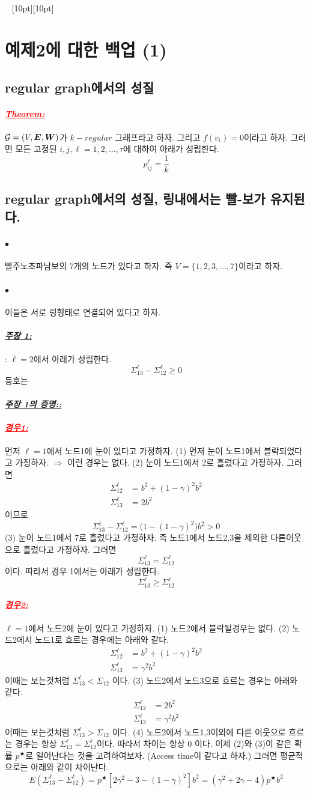 \documentclass[12pt,oneside,english,a4paper]{article}
\newcommand{\dash}{\noindent \newline\textcolor{black}{\hrulefill~ \raisebox{-2.5pt}[10pt][10pt]{\leafright \decofourleft \decothreeleft  \aldineright \decotwo \floweroneleft \decoone   \floweroneright \decotwo \aldineleft\decothreeright \decofourright \leafleft} ~  \hrulefill}}
\def\ck{\paragraph{\LARGE$\bullet$}\LARGE}
\newcommand{\para}[1]{\paragraph{\LARGE\it\underline{\textbf{#1:}}}\LARGE}
\newcommand{\parared}[1]{\paragraph{\LARGE\textcolor{red}{\it\underline{\textbf{#1:}}}}\LARGE}
\newcommand{\bsE}{\mbox{\boldmath $E$}}
\newcommand{\bsW}{\mbox{\boldmath $W$}}
\begin{document}
\dash 

\section{예제2에 대한 백업 (1)}
\subsection{regular graph에서의 성질}
\parared{Theorem} ${\cal G}=(V,\bsE,\bsW)$가 $k-regular$ 그래프라고 하자. 그리고 $f(v_i)=0$이라고 하자. 그러면 모든 고정된 $i, j,\ell=1,2,\dots,\tau$에 대하여 아래가 성립한다.
\[
p_{ij}^{\ell}=\frac{1}{k}
\]

\subsection{regular graph에서의 성질, 링내에서는 빨-보가 유지된다.}
\ck 빨주노초파남보의 7개의 노드가 있다고 하자. 즉 $V=\{1,2,3,\dots,7\}$이라고 하자. 

\ck 이들은 서로 링형태로 연결되어 있다고 하자. 

\para{주장 1}: $\ell=2$에서 아래가 성립한다.
\[
\Sigma_{13}^{\ell}-\Sigma_{12}^{\ell}\geq 0
\]
등호는 

\para{주장 1의 증명:}
\parared{경우1} 먼저 $\ell=1$에서 노드1에 눈이 있다고 가정하자. (1) 먼저 눈이 노드1에서 블락되었다고 가정하자. $\Longrightarrow$ 이런 경우는 없다. (2) 눈이 노드1에서 2로 흘렀다고 가정하자. 그러면 
\begin{align*}
\Sigma_{12}^{\ell}&=b^2+(1-\gamma)^2b^2 \\
\Sigma_{13}^{\ell}&=2b^2
\end{align*}
이므로 
\[
\Sigma_{13}^{\ell}-\Sigma_{12}^{\ell}=\big(1-(1-\gamma)^2\big)b^2>0
\]
(3) 눈이 노드1에서 7로 흘렀다고 가정하자. 즉 노드1에서 노드2,3을 제외한 다른이웃으로 흘렀다고 가정하자. 그러면 
\[
\Sigma_{13}^{\ell}=\Sigma_{12}^{\ell}
\]
이다. 따라서 경우 1에서는 아래가 성립한다. 
\[
\Sigma_{13}^{\ell}\geq\Sigma_{12}^{\ell}
\] 

\parared{경우2} $\ell=1$에서 노드2에 눈이 있다고 가정하자.
(1) 노드2에서 블락될경우는 없다. (2) 노드2에서 노드1로 흐르는 경우에는 아래와 같다. 
\begin{align*}
\Sigma_{12}^{\ell}&=b^2+(1-\gamma)^2b^2 \\
\Sigma_{13}^{\ell}&=\gamma^2b^2
\end{align*}
이때는 보는것처럼 $\Sigma_{13}^{\ell}<\Sigma_{12}$ 이다. (3) 노드2에서 노드3으로 흐르는 경우는 아래와 같다. 
\begin{align*}
\Sigma_{12}^{\ell}&=2b^2 \\
\Sigma_{13}^{\ell}&=\gamma^2b^2
\end{align*}
이때는 보는것처럼 $\Sigma_{13}^{\ell}>\Sigma_{12}$ 이다. (4) 노드2에서 노드1,3이외에 다른 이웃으로 흐르는 경우는 항상 $\Sigma_{13}^{\ell}=\Sigma_{12}^{\ell}$이다. 따라서 차이는 항상 $0$ 이다. 이제 (2)와 (3)이 같은 확률 $p^{\bigstar}$로 일어난다는 것을 고려하여보자. (Access time이 같다고 하자.) 그러면 평균적으로는 아래와 같이 차이난다. 
\[
E(\Sigma_{13}^{\ell}-\Sigma_{12}^{\ell})=p^{\bigstar}\left[2\gamma^2-3-(1-\gamma)^2 \right]b^2=(\gamma^2+2\gamma-4)p^{\bigstar}b^2
\]
\end{document}
